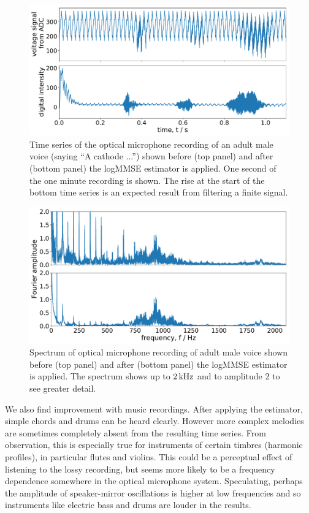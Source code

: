 \documentclass[paper-main.tex]{subfiles}
\begin{document}
\begin{figure}
	\includegraphics[width=.8\textwidth]{figures/filter_timeseries_aa_melatos-cropped.pdf}
	\caption{Time series of the optical microphone recording of an adult male voice (saying ``A cathode ...'') shown before (top panel) and after (bottom panel) the logMMSE estimator is applied. One second of the one minute recording is shown. The rise at the start of the bottom time series is an expected result from filtering a finite signal.}
	\label{fig:logMMSE_timeseries}
\end{figure}

\begin{figure}
	\includegraphics[width=.8\textwidth]{figures/filter_spectrum_aa_melatos-cropped.pdf}
	\caption{Spectrum of optical microphone recording of adult male voice shown before (top panel) and after (bottom panel) the logMMSE estimator is applied. The spectrum shows up to $2\,{\rm kHz}$ and to amplitude $2$ to see greater detail.}
	\label{fig:logMMSE_spectrum}
\end{figure}


We also find improvement with music recordings.
After applying the estimator, simple chords and drums can be heard clearly. 
However more complex melodies are sometimes completely absent from the resulting time series. 
From observation, this is especially true for instruments of certain timbres (harmonic profiles), in particular flutes and violins.
This could be a perceptual effect of listening to the lossy recording, but seems more likely to be a frequency dependence somewhere in the optical microphone system. 
Speculating, perhaps the amplitude of speaker-mirror oscillations is higher at low frequencies and so instruments like electric bass and drums are louder in the results.
\end{document}
